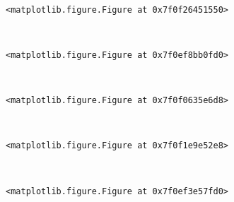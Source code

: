 \documentclass[11pt]{article}
\begin{document}
    
    \begin{center}
    \end{center}
    { \hspace*{\fill} \\}
    
    
    \begin{verbatim}
<matplotlib.figure.Figure at 0x7f0f26451550>
    \end{verbatim}

    
    \begin{center}
    \end{center}
    { \hspace*{\fill} \\}
    
    
    \begin{verbatim}
<matplotlib.figure.Figure at 0x7f0ef8bb0fd0>
    \end{verbatim}

    
    \begin{center}
    \end{center}
    { \hspace*{\fill} \\}
    
    
    \begin{verbatim}
<matplotlib.figure.Figure at 0x7f0f0635e6d8>
    \end{verbatim}

    
    \begin{center}
    \end{center}
    { \hspace*{\fill} \\}
    
    
    \begin{verbatim}
<matplotlib.figure.Figure at 0x7f0f1e9e52e8>
    \end{verbatim}

    
    \begin{center}
    \end{center}
    { \hspace*{\fill} \\}
    
    
    \begin{verbatim}
<matplotlib.figure.Figure at 0x7f0ef3e57fd0>
    \end{verbatim}
\end{document}

